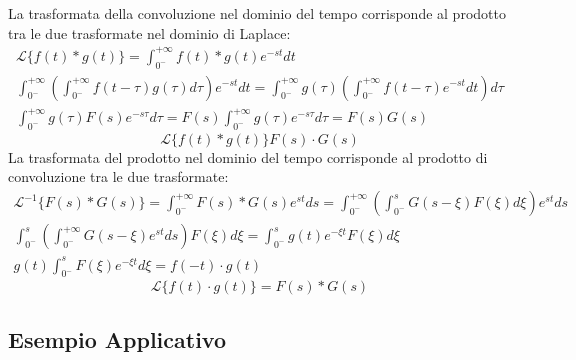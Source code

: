 \documentclass{article}
\numberwithin{equation}{subsection}
\begin{document}
La trasformata della convoluzione nel dominio del tempo corrisponde al prodotto tra le due trasformate nel dominio di Laplace:
\begin{gather*}
    \mathcal{L}\{f(t)* g(t)\}=\displaystyle\int_{0^-}^{+\infty}f(t)*g(t)e^{-st}dt\\
    \displaystyle\int_{0^-}^{+\infty}\left(\int_{0^-}^{+\infty}f(t-\tau)g(\tau)d\tau\right)e^{-st}dt=\int_{0^-}^{+\infty}g(\tau)\left(\int_{0^-}^{+\infty}f(t-\tau)e^{-st}dt\right)d\tau\\
    \displaystyle\int_{0^-}^{+\infty}g(\tau)F(s)e^{-s\tau}d\tau=F(s)\int_{0^-}^{+\infty}g(\tau)e^{-s\tau}d\tau=F(s)G(s)
\end{gather*}
\begin{equation}
    \mathcal{L}\{f(t)*g(t)\}F(s)\cdot G(s)
\end{equation}
La trasformata del prodotto nel dominio del tempo corrisponde al prodotto di convoluzione tra le due trasformate:
\begin{gather*}
    \mathcal{L}^{-1}\{F(s)*G(s)\}=\displaystyle\int_{0^-}^{+\infty}F(s)*G(s)e^{st}ds=\int_{0^-}^{+\infty}\left(\int_{0^-}^sG(s-\xi)F(\xi)d\xi\right)e^{st}ds\\
    \displaystyle\int_{0^-}^{s}\left(\int_{0^-}^{+\infty}G(s-\xi)e^{st}ds\right)F(\xi)d\xi=\int_{0^-}^sg(t)e^{-\xi t}F(\xi)d\xi\\
    g(t)\displaystyle\int_{0^-}^{s}F(\xi)e^{-\xi t}d\xi=f(-t)\cdot g(t)
\end{gather*}
\begin{equation}
    \mathcal{L}\{f(t)\cdot g(t)\}=F(s)*G(s)
\end{equation}


\subsection{Esempio Applicativo}
\end{document}
